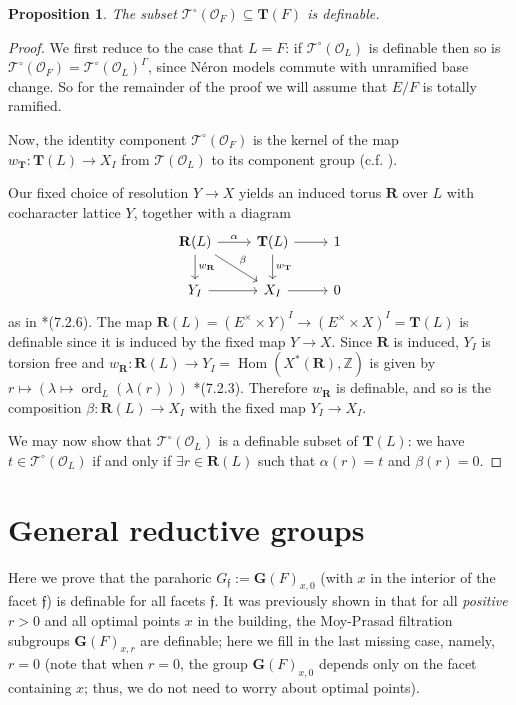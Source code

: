 \documentclass{amsart}
\newcommand{\Z}{{\mathbb Z}}
\newcommand{\ri}{\mathcal{O}}
\newcommand{\bG}{\mathbf{G}}
\newcommand{\bT}{\mathbf {T}}
\newcommand{\bR}{\mathbf{R}}
\newcommand{\ff}{{\mathfrak f}}
\newcommand{\Ner}[1]{\mathcal{#1}}
\newcommand{\NerC}[1]{\mathcal{#1}^\circ}
\DeclareMathOperator{\ord}{ord}
\DeclareMathOperator{\Hom}{Hom}
\theoremstyle{plain}
\newtheorem{prop}[thm]{Proposition}
\theoremstyle{definition}
\begin{document}
\begin{prop} \label{prop:NerCdefinable}
The subset $\NerC{T}(\ri_F) \subseteq \bT(F)$ is definable.
\end{prop}
\begin{proof}
We first reduce to the case that $L = F$: if $\NerC{T}(\ri_L)$ is definable then so is $\NerC{T}(\ri_F) = \NerC{T}(\ri_L)^\Gamma$, since N\'eron models commute with unramified base change.  So for the remainder of the proof we will assume that $E/F$ is totally ramified.

Now, the identity component $\NerC{T}(\ri_F)$ is the kernel of the map $w_\bT : \bT(L) \to X_I$ from $\Ner{T}(\ri_L)$ to its component group (c.f. ).

Our fixed choice of resolution $Y \to X$ yields an induced torus $\bR$ over $L$ with cocharacter lattice $Y$, together with a diagram
\[
\begin{tikzcd}
\bR(L) \rar{\alpha} \dar{w_{\bR}} \drar{\beta} & \bT(L) \rar \dar{w_{\bT}} & 1 \\
Y_I \rar & X_I \rar & 0
\end{tikzcd}
\]
as in \cite{kottwitz:isocrystals-2}*{(7.2.6)}.  The map $\bR(L) = (E^\times \times Y)^I \to (E^\times \times X)^I = \bT(L)$
is definable since it is induced by the fixed map $Y \to X$.  Since $\bR$ is induced,
$Y_I$ is torsion free and $w_\bR : \bR(L) \to Y_I = \Hom(X^\ast(\bR), \Z)$ is given by
$r \mapsto \left(\lambda \mapsto \ord_{L}(\lambda(r))\right)$ \cite{kottwitz:isocrystals-2}*{(7.2.3)}.
Therefore $w_\bR$ is definable, and so is the composition $\beta : \bR(L) \to X_I$ with the fixed map $Y_I \to X_I$.

We may now show that $\NerC{T}(\ri_L)$ is a definable subset of $\bT(L)$: we have $t \in \NerC{T}(\ri_L)$ if and only if $\exists r \in \bR(L)$ such that $\alpha(r) = t$ and $\beta(r) = 0$.
\end{proof}

\section{General reductive groups}
Here we prove that the parahoric ${G}_{\ff}:={\bG}(F)_{x, 0}$ (with $x$ in the interior of the facet $\ff$)   is definable for  all facets $\ff$.  
It was previously shown in \cite{CGH-2} that for all \emph{positive} $r>0$ and all {optimal} points $x$ in the building, the Moy-Prasad filtration subgroups ${\bG}(F)_{x, r}$ are definable; here we fill in the last missing case, namely, $r=0$ (note that when $r=0$, the group ${\bG}(F)_{x,0}$ depends only on the facet containing $x$; thus, we do not need to worry about optimal points).
\end{document}
